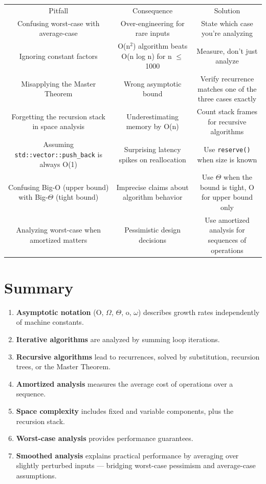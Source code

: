 \begin{center}
\begin{tabular}{ccc}
\toprule
Pitfall & Consequence & Solution \\
Confusing worst-case with average-case & Over-engineering for rare inputs & State which case you're analyzing \\
Ignoring constant factors & O(n$^{2}$) algorithm beats O(n log n) for n $\le $ 1000 & Measure, don't just analyze \\
Misapplying the Master Theorem & Wrong asymptotic bound & Verify recurrence matches one of the three cases exactly \\
Forgetting the recursion stack in space analysis & Underestimating memory by O(n) & Count stack frames for recursive algorithms \\
Assuming \texttt{std::vector::push\_back} is always O(1) & Surprising latency spikes on reallocation & Use \texttt{reserve()} when size is known \\
Confusing Big-O (upper bound) with Big-$\Theta $ (tight bound) & Imprecise claims about algorithm behavior & Use $\Theta $ when the bound is tight, O for upper bound only \\
Analyzing worst-case when amortized matters & Pessimistic design decisions & Use amortized analysis for sequences of operations \\

\bottomrule
\end{tabular}
\end{center}
\section{Summary}

\begin{enumerate}
\item \textbf{Asymptotic notation} (O, $\Omega $, $\Theta $, o, $\omega $) describes growth rates independently of machine constants.
\item \textbf{Iterative algorithms} are analyzed by summing loop iterations.
\item \textbf{Recursive algorithms} lead to recurrences, solved by substitution, recursion trees, or the Master Theorem.
\item \textbf{Amortized analysis} measures the average cost of operations over a sequence.
\item \textbf{Space complexity} includes fixed and variable components, plus the recursion stack.
\item \textbf{Worst-case analysis} provides performance guarantees.
\item \textbf{Smoothed analysis} explains practical performance by averaging over slightly perturbed inputs — bridging worst-case pessimism and average-case assumptions.
\end{enumerate}


